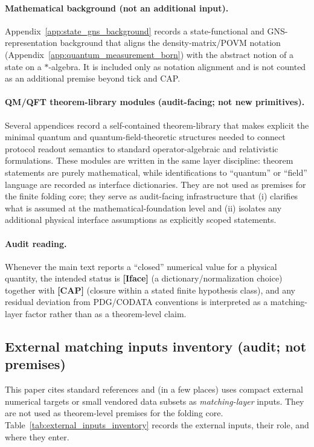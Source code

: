 \paragraph{Mathematical background (not an additional input).}
\AuditTag Appendix~\ref{app:state_gns_background} records a state-functional and GNS-representation background that aligns the density-matrix/POVM notation (Appendix~\ref{app:quantum_measurement_born}) with the abstract notion of a state on a $*$-algebra.
It is included only as notation alignment and is not counted as an additional premise beyond tick and CAP.

\paragraph{QM/QFT theorem-library modules (audit-facing; not new primitives).}
\AuditTag Several appendices record a self-contained theorem-library that makes explicit the minimal quantum and quantum-field-theoretic structures needed to connect protocol readout semantics to standard operator-algebraic and relativistic formulations.
These modules are written in the same layer discipline: theorem statements are purely mathematical, while identifications to ``quantum'' or ``field'' language are recorded as interface dictionaries.
They are not used as premises for the finite folding core; they serve as audit-facing infrastructure that (i) clarifies what is assumed at the mathematical-foundation level and (ii) isolates any additional physical interface assumptions as explicitly scoped statements.

\paragraph{Audit reading.}
Whenever the main text reports a ``closed'' numerical value for a physical quantity, the intended status is \textbf{[Iface]} (a dictionary/normalization choice) together with \textbf{[CAP]} (closure within a stated finite hypothesis class), and any residual deviation from PDG/CODATA conventions is interpreted as a matching-layer factor rather than as a theorem-level claim.

\subsection{External matching inputs inventory (audit; not premises)}
\label{subsec:external_inputs_inventory}

\MatchTag This paper cites standard references and (in a few places) uses compact external numerical targets or small vendored data subsets as \emph{matching-layer} inputs.
They are not used as theorem-level premises for the folding core.
Table~\ref{tab:external_inputs_inventory} records the external inputs, their role, and where they enter.

